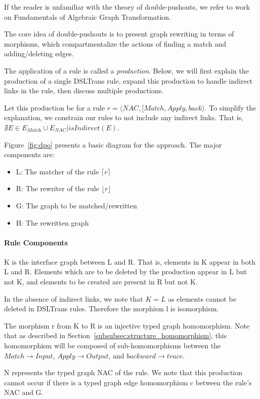 If the reader is unfamiliar with the theory of double-pushouts, we refer to work on Fundamentals of Algebraic Graph Transformation.

The core idea of double-pushouts is to present graph rewriting in terms of morphisms, which compartmentalize the actions of finding a match and adding/deleting edges.

The application of a rule is called a \textit{production}. Below, we will first explain the production of a single DSLTrans rule, expand this production to handle indirect links in the rule, then discuss multiple productions.

Let this production be for a rule $r = \langle \mathit{NAC}, \mathit{[Match}, \mathit{Apply}, \mathit{back} \rangle$. To simplify the explanation, we constrain our rules to not include any indirect links. That is, $\nexists E \in E_{\textit{Match}} \cup E_{\mathit{NAC}} | \mathit{isIndirect}(E)$.

Figure~\ref{fig:dpo} presents a basic diagram for the approach.
The major components are:
\begin{itemize}
\item L: The matcher of the rule $\lceil r \rceil$
\item R: The rewriter of the rule $\lfloor r \rfloor$
\item G: The graph to be matched/rewritten
\item H: The rewritten graph
\end{itemize}

\paragraph{Rule Components}
K is the interface graph between L and R. That is, elements in K appear in both L and R. Elements which are to be deleted by the production appear in L but not K, and elements to be created are present in R but not K.

In the absence of indirect links, we note that $K = L$ as elements cannot be deleted in DSLTrans rules. Therefore the morphism l is isomorphism.

The morphism r from K to R is an injective typed graph homomorphism. Note that as described in Section~\ref{subsubsec:structure_homomorphism}, this homomorphism will be composed of sub-homomorphisms between the $\mathit{Match} \rightarrow \mathit{Input}$, $\mathit{Apply} \rightarrow \mathit{Output}$, and $\mathit{backward} \rightarrow \mathit{trace}$.

N represents the typed graph NAC of the rule. We note that this production cannot occur if there is a typed graph edge homomorphism c between the rule's NAC and G. 


